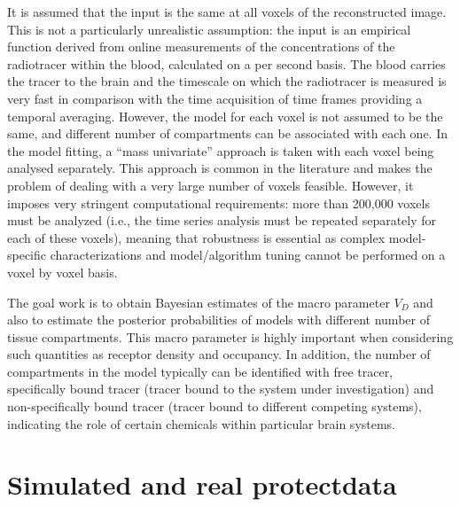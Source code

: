 It is assumed that the input is the same at all voxels of the reconstructed
image. This is not a particularly unrealistic assumption: the input is an
empirical function derived from online measurements of the concentrations
of the radiotracer within the blood, calculated on a per second basis. The
blood carries the tracer to the brain and the timescale on which the
radiotracer is measured is very fast in comparison with the time
acquisition of \pet time frames providing a temporal averaging. However,
the model for each voxel is not assumed to be the same, and different
number of compartments can be associated with each one. In the model
fitting, a ``mass univariate'' approach is taken with each voxel being
analysed separately. This approach is common in the literature and makes
the problem of dealing with a very large number of voxels feasible.
However, it imposes very stringent computational requirements: more than
200,000 voxels must be analyzed (i.e., the time series analysis must be
repeated separately for each of these voxels), meaning that robustness is
essential as complex model-specific characterizations and model/algorithm
tuning cannot be performed on a voxel by voxel basis.

The goal work is to obtain Bayesian estimates of the macro parameter $V_D$ and
also to estimate the posterior probabilities of models with different number
of tissue compartments. This macro parameter is highly important when
considering such quantities as receptor density and occupancy. In addition,
the number of compartments in the model typically can be identified with free
tracer, specifically bound tracer (tracer bound to the system under
investigation) and non-specifically bound tracer (tracer bound to different
competing systems), indicating the role of certain chemicals within particular
brain systems.

\section{Simulated and real protect\pet data}
\label{sec:Simulated and real pet data}

